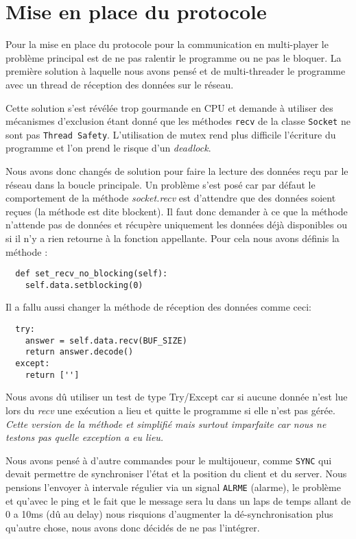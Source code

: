 \documentclass[12pt]{report}
\begin{document}
\chapter{Mise en place du protocole}
Pour la mise en place du protocole pour la communication en multi-player le
problème principal est de ne pas ralentir le programme ou ne pas le bloquer.
La première solution à laquelle nous avons pensé et de multi-threader le
programme avec un thread de réception des données sur le réseau.

Cette solution s'est révélée trop gourmande en CPU et demande à utiliser des
mécanismes d'exclusion étant donné que les méthodes \texttt{recv} de la classe
\texttt{Socket} ne sont pas \texttt{Thread Safety}.
L'utilisation de mutex rend plus difficile l'écriture du programme et l'on
prend le risque d'un \textit{deadlock}.

Nous avons donc changés de solution pour faire la lecture des données reçu
par le réseau dans la boucle principale.
Un problème s'est posé car par défaut le comportement de la
méthode \textit{socket.recv} est d'attendre que des données soient reçues (la
méthode est dite blockent). Il faut donc demander à ce que la méthode
n'attende pas de données et récupère uniquement les données déjà
disponibles ou si il n'y a rien retourne à la fonction appellante.
Pour cela nous avons définis la méthode :
\begin{verbatim}
  def set_recv_no_blocking(self):
    self.data.setblocking(0)
\end{verbatim}

Il a fallu aussi changer la méthode de réception des données comme ceci:
\begin{verbatim}
  try:
    answer = self.data.recv(BUF_SIZE)
    return answer.decode()
  except:
    return ['']
\end{verbatim}

Nous avons dû utiliser un test de type Try/Except car si aucune donnée n'est lue
lors du \textit{recv} une exécution a lieu et quitte le programme si elle
n'est pas gérée.
\textit{Cette version de la méthode et simplifié mais surtout imparfaite
  car nous ne testons pas quelle exception a eu lieu.}

Nous avons pensé à d'autre commandes pour le multijoueur, comme \texttt{SYNC} qui
devait permettre de synchroniser l'état et la position du client et du server.
Nous pensions l'envoyer à intervale régulier via un signal \texttt{ALRME} (alarme),
le problème et qu'avec le ping et le fait que le message sera lu dans un laps
de temps allant de 0 a 10ms (dû au delay) nous risquions d'augmenter la
dé-synchronisation plus qu'autre chose, nous avons donc décidés de ne
pas l'intégrer.
\end{document}

